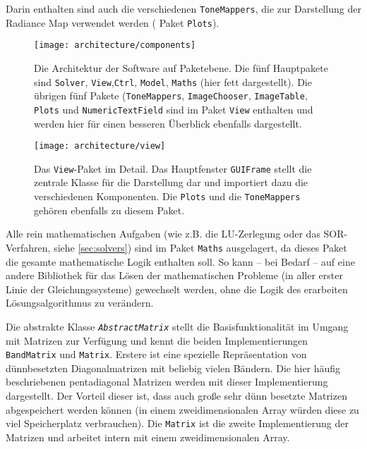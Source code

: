Darin enthalten sind auch die verschiedenen \texttt{ToneMappers}, die zur Darstellung der \gls{Radiance Map} verwendet werden ( Paket \texttt{Plots}).

\begin{figure}
  \begin{center}
    \texttt{[image: architecture/components]}
    \caption{Die Architektur der Software auf Paketebene. Die fünf Hauptpakete sind \texttt{Solver}, \texttt{View},\texttt{Ctrl}, \texttt{Model}, \texttt{Maths} (hier fett dargestellt).  Die übrigen fünf Pakete (\texttt{ToneMappers}, \texttt{ImageChooser}, \texttt{ImageTable}, \texttt{Plots} und \texttt{NumericTextField} sind im Paket \texttt{View} enthalten und werden hier für einen besseren Überblick ebenfalls dargestellt.}
    \label{fig:arch:components}
  \end{center}
\end{figure}


\begin{figure}
  \begin{center}
    \texttt{[image: architecture/view]}
    \caption{Das \texttt{View}-Paket im Detail. Das Hauptfenster \texttt{GUIFrame} stellt die zentrale Klasse für die Darstellung dar und importiert dazu die verschiedenen Komponenten. Die \texttt{Plots} und die \texttt{ToneMappers} gehören ebenfalls zu diesem Paket.}
    \label{fig:arch:view}
  \end{center}
\end{figure}

Alle rein mathematischen Aufgaben (wie z.B. die LU-Zerlegung oder das SOR-Verfahren, siehe \autoref{sec:solvers}) sind im Paket \texttt{Maths} ausgelagert, da dieses Paket die gesamte mathematische Logik enthalten soll. So kann -- bei Bedarf -- auf eine andere Bibliothek für das Lösen der mathematischen Probleme (in aller erster Linie der Gleichungssysteme) gewechselt werden, ohne die Logik des erarbeiten Lösungsalgorithmus zu verändern. 

Die abstrakte Klasse \textit{\texttt{AbstractMatrix}} stellt die Basisfunktionalität im Umgang mit Matrizen zur Verfügung und kennt die beiden Implementierungen \texttt{BandMatrix} und \texttt{Matrix}. Erstere ist eine spezielle Repräsentation von dünnbesetzten Diagonalmatrizen mit beliebig vielen Bändern. Die hier häufig beschriebenen pentadiagonal Matrizen werden mit dieser Implementierung dargestellt. Der Vorteil dieser ist, dass auch große sehr dünn besetzte Matrizen abgespeichert werden können (in einem zweidimensionalen Array würden diese zu viel Speicherplatz verbrauchen). Die \texttt{Matrix} ist die zweite Implementierung der Matrizen und arbeitet intern mit einem zweidimensionalen Array.

